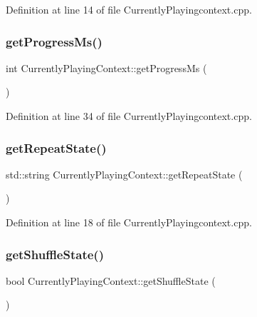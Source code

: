 Definition at line 14 of file Currently\+Playingcontext.\+cpp.

\mbox{\label{class_currently_playing_context_af75403338a29e06b2948ee3b7c9ca207}} 
\subsubsection{\texorpdfstring{get\+Progress\+Ms()}{getProgressMs()}}
{\footnotesize\ttfamily int Currently\+Playing\+Context\+::get\+Progress\+Ms (\begin{DoxyParamCaption}{ }\end{DoxyParamCaption})}



Definition at line 34 of file Currently\+Playingcontext.\+cpp.

\mbox{\label{class_currently_playing_context_a66a5face7cdcb884ed61ec03071f8e38}} 
\subsubsection{\texorpdfstring{get\+Repeat\+State()}{getRepeatState()}}
{\footnotesize\ttfamily std\+::string Currently\+Playing\+Context\+::get\+Repeat\+State (\begin{DoxyParamCaption}{ }\end{DoxyParamCaption})}



Definition at line 18 of file Currently\+Playingcontext.\+cpp.

\mbox{\label{class_currently_playing_context_a0104f25d9533804fef7ef35470c16ce7}} 
\subsubsection{\texorpdfstring{get\+Shuffle\+State()}{getShuffleState()}}
{\footnotesize\ttfamily bool Currently\+Playing\+Context\+::get\+Shuffle\+State (\begin{DoxyParamCaption}{ }\end{DoxyParamCaption})}



